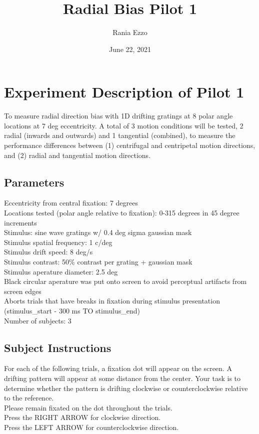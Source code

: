 \documentclass[11pt]{article} %
\title{Radial Bias Pilot 1}
\date{June 22, 2021}
\author{Rania Ezzo}
\begin{document}
\maketitle
\tableofcontents


\section{Experiment Description of Pilot 1}
To measure radial direction bias with 1D drifting gratings at 8 polar angle locations at 7 deg eccentricity. A total of 3 motion conditions will be tested, 2 radial (inwards and outwards) and 1 tangential (combined), to measure the performance differences between (1) centrifugal and centripetal motion directions, and (2) radial and tangential motion directions. 

\subsection{Parameters}
Eccentricity from central fixation: 7 degrees
\\
Locations tested (polar angle relative to fixation): 0-315 degrees in 45 degree increments
\\
Stimulus: sine wave gratings w/ 0.4 deg sigma gaussian mask
\\
Stimulus spatial frequency: 1 c/deg
\\
Stimulus drift speed: 8 deg/s
\\
Stimulus contrast: 50\% contrast per grating + gaussian mask
\\
Stimulus aperature diameter: 2.5 deg
\\
Black circular aperature was put onto screen to avoid perceptual artifacts from screen edges
\\
Aborts trials that have breaks in fixation during stimulus presentation (stimulus\_start - 300 ms TO stimulus\_end)
\\
Number of subjects: 3

\subsection{Subject Instructions}
For each of the following trials, a fixation dot will appear on the screen. A drifting pattern will appear at some distance from the center. Your task is to determine whether the pattern is drifting clockwise or counterclockwise relative to the reference.
\\
Please remain fixated on the dot throughout the trials.
\\
Press the RIGHT ARROW for clockwise direction.
\\
Press the LEFT ARROW for counterclockwise direction.
\end{document}
